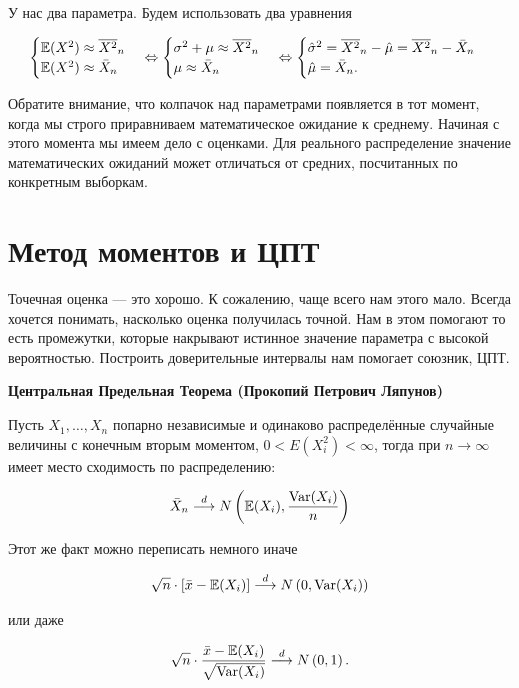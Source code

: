 \documentclass[12pt, a4paper, oneside]{article}
\begin{document}
\begin{sol}
У нас два параметра. Будем использовать два уравнения

\[
\begin{cases} 
\mathbb{E}(X^2) \approx \overline{X^2}_n   \\
\mathbb{E}(X^2) \approx  \bar{X}_n 
\end{cases} \Leftrightarrow \begin{cases} 
\sigma^2 + \mu \approx \overline{X^2}_n   \\
 \mu \approx \bar{X}_n
\end{cases}  \Leftrightarrow \begin{cases} 
 \hat{\sigma}^2 = \overline{X^2}_n - \hat{\mu} = \overline{X^2}_n - \bar{X}_n \\
\hat{\mu} = \bar{X}_n.
\end{cases}
\]

Обратите внимание, что колпачок над параметрами появляется в тот момент, когда мы строго приравниваем математическое ожидание к среднему. Начиная с этого момента мы имеем дело с оценками. Для реального распределение значение математических ожиданий может отличаться от средних, посчитанных по конкретным выборкам. 
\end{sol} 


\section{Метод моментов и ЦПТ}

Точечная оценка --- это хорошо. К сожалению, чаще всего нам этого мало. Всегда хочется понимать, насколько оценка получилась точной. Нам в этом помогают  то есть промежутки, которые накрывают истинное значение параметра с высокой вероятностью. Построить доверительные интервалы нам помогает союзник, ЦПТ.

\begin{theorem}{\textbf{Центральная Предельная Теорема (Прокопий Петрович Ляпунов)}}

Пусть $X_1, \ldots, X_n$ попарно независимые и одинаково распределённые случайные величины с конечным вторым моментом, $0 < E(X_i^2) < \infty$, тогда при $n \to \infty$ имеет место сходимость по распределению: 

\[
\bar{X}_n \stackrel{d}{\longrightarrow} N \left(\mathbb{E}(X_i), \frac{\operatorname{Var}(X_i)}{n} \right)
\]

Этот же факт можно переписать немного иначе

\[
\sqrt{n} \cdot [\bar{x} - \mathbb{E}(X_i)]  \stackrel{d}{\longrightarrow} N \left(0, \operatorname{Var}(X_i)\right)
\]

или даже 

\[
\sqrt{n} \cdot \frac{\bar{x} - \mathbb{E}(X_i)}{\sqrt{\operatorname{Var}(X_i)}}  \stackrel{d}{\longrightarrow} N \left(0, 1\right).
\]
\end{theorem}
\end{document}

